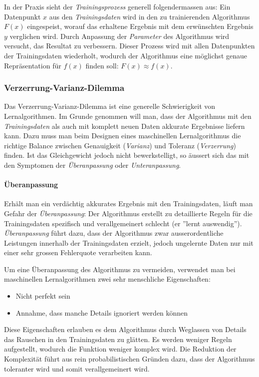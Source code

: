 In der Praxis sieht der \textit{Trainingsprozess} generell folgendermassen aus: Ein Datenpunkt $x$ aus den \textit{Trainingsdaten} wird in den zu trainierenden Algorithmus $F(x)$ eingespeist, worauf das erhaltene Ergebnis mit dem erwünschten Ergebnis $y$ verglichen wird. Durch Anpassung der \textit{Parameter} des Algorithmus wird versucht, das Resultat zu verbessern. Dieser Prozess wird mit allen Datenpunkten der Trainingsdaten wiederholt, wodurch der Algorithmus eine möglichst genaue Repräsentation für $f(x)$ finden soll: $F(x) \approx f(x)$.

\subsubsection{Verzerrung-Varianz-Dilemma}\label{cha:theo:ml:b-v}
Das Verzerrung-Varianz-Dilemma\cite{bias} ist eine generelle Schwierigkeit von Lernalgorithmen. Im Grunde genommen will man, dass der Algorithmus mit den \textit{Trainingsdaten} als auch mit komplett neuen Daten akkurate Ergebnisse liefern kann. Dazu muss man beim Designen eines maschinellen Lernalgorithmus die richtige Balance zwischen Genauigkeit (\textit{Varianz}) und Toleranz (\textit{Verzerrung}) finden. Ist das Gleichgewicht jedoch nicht bewerkstelligt, so äussert sich das mit den Symptomen der \textit{Überanpassung} oder \textit{Unteranpassung}.

\paragraph{Überanpassung} Erhält man ein verdächtig akkurates Ergebnis mit den Trainingsdaten, läuft man Gefahr der \textit{Überanpassung}: Der Algorithmus erstellt zu detaillierte Regeln für die Trainingsdaten spezifisch und verallgemeinert schlecht (er ''lernt auswendig''). \textit{Überanpassung} führt dazu, dass der Algorithmus zwar ausserordentliche Leistungen innerhalb der Trainingsdaten erzielt, jedoch ungelernte Daten nur mit einer sehr grossen Fehlerquote verarbeiten kann.

Um eine Überanpassung des Algorithmus zu vermeiden, verwendet man bei maschinellen Lernalgorithmen zwei sehr menschliche Eigenschaften:
\begin{itemize}[leftmargin=2cm]
	\item Nicht perfekt sein
	\item Annahme, dass manche Details ignoriert werden können
\end{itemize}
Diese Eigenschaften erlauben es dem Algorithmus durch Weglassen von Details das Rauschen in den Trainingsdaten zu glätten. Es werden weniger Regeln aufgestellt, wodurch die Funktion weniger komplex wird. Die Reduktion der Komplexität führt aus rein probabilistischen Gründen dazu, dass der Algorithmus toleranter wird und somit verallgemeinert wird\cite{welch_prob}.

